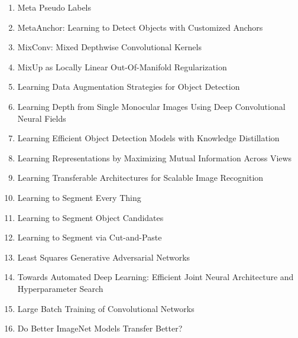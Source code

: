\documentclass[acmlarge]{acmart}
\begin{document}
\begin{enumerate}
	\item Meta Pseudo Labels \cite{Pham2021MetaPL} 

	\item MetaAnchor: Learning to Detect Objects with Customized Anchors \cite{Yang2018MetaAnchorLT} 

	\item MixConv: Mixed Depthwise Convolutional Kernels \cite{Tan2019MixConvMD} 

	\item MixUp as Locally Linear Out-Of-Manifold Regularization \cite{Guo2019MixUpAL} 

	\item Learning Data Augmentation Strategies for Object Detection \cite{Zoph2020LearningDA} 

	\item Learning Depth from Single Monocular Images Using Deep Convolutional Neural Fields \cite{Liu2016LearningDF} 

	\item Learning Efficient Object Detection Models with Knowledge Distillation \cite{Chen2017LearningEO} 

	\item Learning Representations by Maximizing Mutual Information Across Views \cite{Bachman2019LearningRB} 

	\item Learning Transferable Architectures for Scalable Image Recognition \cite{Zoph2018LearningTA} 

	\item Learning to Segment Every Thing \cite{Hu2018LearningTS} 

	\item Learning to Segment Object Candidates \cite{Pinheiro2015LearningTS} 

	\item Learning to Segment via Cut-and-Paste \cite{Remez2018LearningTS} 

	\item Least Squares Generative Adversarial Networks \cite{Mao2017LeastSG} 

	\item Towards Automated Deep Learning: Efficient Joint Neural Architecture and Hyperparameter Search \cite{Zela2018TowardsAD} 

	\item Large Batch Training of Convolutional Networks \cite{You2017LargeBT} 

	\item Do Better ImageNet Models Transfer Better? \cite{Kornblith2019DoBI} 


\end{enumerate}
\end{document}
